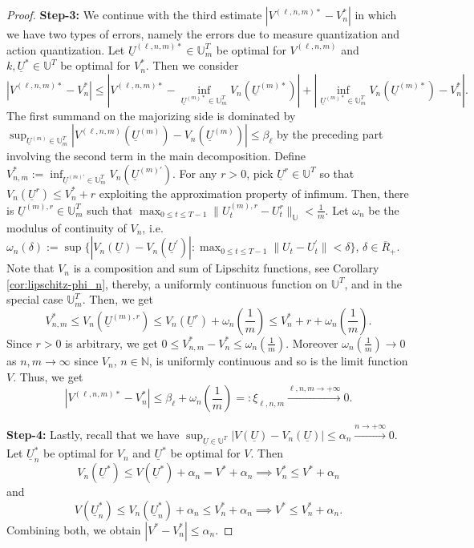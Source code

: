 \documentclass[11pt]{article}
\newcommand{\NN}{\mathbb{N}}
\newcommand{\UU}{\mathbb{U}}
\begin{document}
\begin{proof}
\noindent\textbf{Step-3:} We continue with the third estimate $|V^{(\ell,n,m)*} - V_n^*|$ in which we have two types of errors, namely the errors due to measure quantization and action quantization. Let $\underline{U}^{(\ell,n,m)*}\in\UU_m^T$ be optimal for $V^{(\ell,n,m)}$ and $k,\underline{U}^{*}\in\UU^T$ be optimal for $V_n^*$. Then we consider
\begin{equation*}
    |V^{(\ell,n,m)*} - V_n^*| \leq |V^{(\ell,n,m)*}-\inf_{\underline{U}^{(m)*}\in\UU_m^T}V_n(\underline{U}^{(m)*})| + |\inf_{\underline{U}^{(m)*}\in\UU_m^T}V_n(\underline{U}^{(m)*}) - V_n^*|.
\end{equation*}
The first summand on the majorizing side is dominated by $\sup_{\underline{U}^{(m)}\in\UU_m^T}|V^{(\ell,n,m)}(\underline{U}^{(m)}) - V_n(\underline{U}^{(m)})| \leq \beta_\ell$ by the preceding part involving the second term in the main decomposition. Define $V_{n,m}^* := \inf_{\underline{U}^{(m)\prime}\in\UU_m^T}V_n(\underline{U}^{(m)\prime})$. For any $r > 0$, pick $\underline{U}^r\in\UU^T$ so that $V_n(\underline{U}^r) \leq V_n^* + r$ exploiting the approximation property of infimum. Then, there is $\underline{U}^{(m),r}\in\UU_m^T$ such that $\max_{0\leq t\leq T-1}\|U_t^{(m),r} - U_t^r\|_\UU < \frac{1}{m}$. Let $\omega_n$ be the modulus of continuity of $V_n$, i.e. $\omega_n(\delta) := \sup\{|V_n(\underline{U}) - V_n(\underline{U}^\prime)| : \max_{0\leq t\leq T-1}\|U_t - U_t^\prime\| < \delta\}$, $\delta\in\overline{R}_+$. Note that $V_n$ is a composition and sum of Lipschitz functions, see Corollary \ref{cor:lipschitz-phi_n}, thereby, a uniformly continuous function on $\UU^T$, and in the special case $\UU_m^T$. Then, we get
\begin{equation*}
    V_{n,m}^* \leq V_n(\underline{U}^{(m),r}) \leq V_n(\underline{U}^r) + \omega_n\left(\frac{1}{m}\right) \leq V_n^* + r + \omega_n\left(\frac{1}{m}\right).
\end{equation*}
Since $r>0$ is arbitrary, we get $0 \leq V_{n,m}^* - V_n^* \leq \omega_n\left(\frac{1}{m}\right)$. Moreover $\omega_n\left(\frac{1}{m}\right)\to 0$ as $n,m\to\infty$ since $V_n$, $n\in\NN$, is uniformly continuous and so is the limit function $V$. Thus, we get
\begin{equation*}
    |V^{(\ell,n,m)*} - V_n^*| \leq \beta_\ell + \omega_n\left(\frac{1}{m}\right) =: \xi_{\ell,n,m}\xrightarrow{\ell,n,m\to+\infty}0.
\end{equation*}

\noindent\textbf{Step-4:} Lastly, recall that we have $\sup_{\underline{U}\in\UU^T}|V(\underline{U}) - V_n(\underline{U})| \leq \alpha_n \xrightarrow{n\to+\infty}0$. Let $\underline{U}_n^*$ be optimal for $V_n$ and $\underline{U}^*$ be optimal for $V$. Then
\begin{equation*}
    V_n(\underline{U}^*) \leq V(\underline{U}^*) + \alpha_n = V^* + \alpha_n \implies V_n^* \leq V^* + \alpha_n
\end{equation*}
and
\begin{equation*}
    V(\underline{U}_n^*) \leq V_n(\underline{U}_n^*) + \alpha_n \leq V_n^* + \alpha_n \implies V^* \leq V_n^* + \alpha_n.
\end{equation*}
Combining both, we obtain $|V^* - V_n^*| \leq \alpha_n$.


\end{proof}
\end{document}
